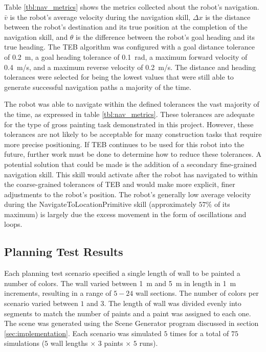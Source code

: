 Table \ref{tbl:nav_metrics} shows the metrics collected about the robot's navigation. $\bar{v}$ is the robot's average velocity during the navigation skill, $\Delta x$ is the distance between the robot's destination and its true position at the completion of the navigation skill, and $\theta$ is the difference between the robot's goal heading and its true heading. The TEB algorithm was configured with a goal distance tolerance of \SI{0.2}{\meter}, a goal heading tolerance of \SI{0.1}{rad}, a maximum forward velocity of \SI{0.4}{\meter/\second}, and a maximum reverse velocity of \SI{0.2}{\meter/\second}. The distance and heading tolerances were selected for being the lowest values that were still able to generate successful navigation paths a majority of the time.

The robot was able to navigate within the defined tolerances the vast majority of the time, as expressed in table \ref{tbl:nav_metrics}. These tolerances are adequate for the type of gross painting task demonstrated in this project. However, these tolerances are not likely to be acceptable for many construction tasks that require more precise positioning. If TEB continues to be used for this robot into the future, further work must be done to determine how to reduce these tolerances. A potential solution that could be made is the addition of a secondary fine-grained navigation skill. This skill would activate after the robot has navigated to within the coarse-grained tolerances of TEB and would make more explicit, finer adjustments to the robot's position. The robot's generally low average velocity during the NavigateToLocationPrimitive skill (approximately $57\%$ of its maximum) is largely due the excess movement in the form of oscillations and loops. %

\subsection{Planning Test Results} \label{sec:results_plan}
Each planning test scenario specified a single length of wall to be painted a number of colors. The wall varied between \SI{1}{m} and \SI{5}{m} in length in \SI{1}{m} increments, resulting in a range of $5-24$ wall sections. The number of colors per scenario varied between $1$ and $3$. The length of wall was divided evenly into segments to match the number of paints and a paint was assigned to each one. The scene was generated using the Scene Generator program discussed in section \ref{sec:implementation}. Each scenario was simulated $5$ times for a total of $75$ simulations ($5$ wall lengths $\times$ $3$ paints $\times$ $5$ runs).



